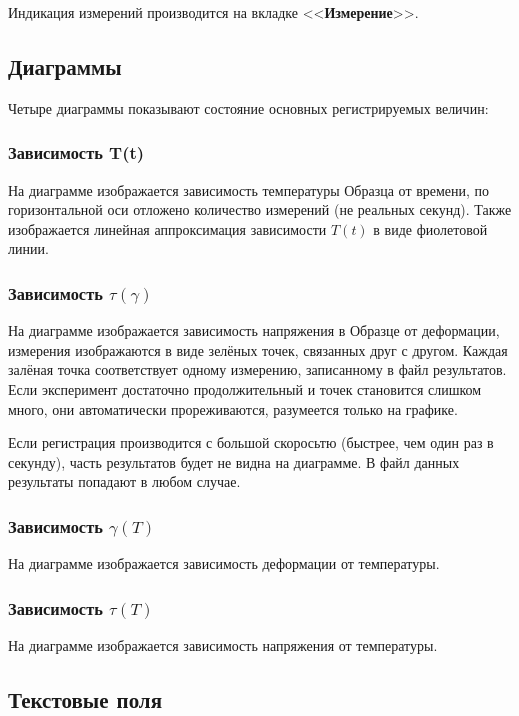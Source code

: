 \documentclass[12pt, a4paper, twocolumn]{report}
\newcommand{\CTL}[1]{<<{\bf #1}>>}
\begin{document}
Индикация измерений производится на вкладке \CTL{Измерение}.

\subsection{Диаграммы}

Четыре диаграммы показывают состояние основных регистрируемых величин:

\subsubsection{Зависимость T(t)}

На диаграмме изображается зависимость температуры Образца от времени, по горизонтальной оси отложено количество измерений (не реальных секунд). Также изображается линейная аппроксимация зависимости $T(t)$ в виде фиолетовой линии.

\subsubsection{Зависимость $\tau(\gamma)$}

На диаграмме изображается зависимость напряжения в Образце от деформации, измерения изображаются в виде зелёных точек, связанных друг с другом. Каждая залёная точка соответствует одному измерению, записанному в файл результатов. Если эксперимент достаточно продолжительный и точек становится слишком много, они автоматически прореживаются, разумеется только на графике.

Если регистрация производится с большой скоросьтю (быстрее, чем один раз в секунду), часть результатов будет не видна на диаграмме. В файл данных результаты попадают в любом случае.

\subsubsection{Зависимость $\gamma(T)$}

На диаграмме изображается зависимость деформации от температуры.

\subsubsection{Зависимость $\tau(T)$}

На диаграмме изображается зависимость напряжения от температуры.

\subsection{Текстовые поля}
\end{document}
